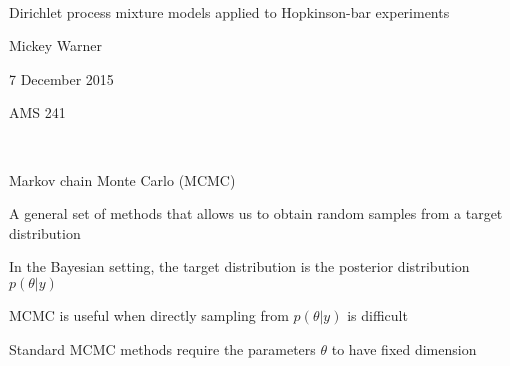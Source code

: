 \documentclass[mathserif, 12pt, t]{beamer}
\newcommand{\m}[1]{#1}
\renewcommand{\frametitle}[1]{\vspace{0.14cm}\hspace{-0.70cm}\textcolor{col2}{%
    \Large{#1}}\vspace{0.15cm}\newline}
\begin{document}
\ \\ [-0.5in]
\vfill
\bigskip
\bigskip
\bigskip
\bigskip
\bigskip

\begin{Large}
Dirichlet process mixture models applied to Hopkinson-bar experiments
\end{Large}
\vfill

Mickey Warner
\vfill

7 December 2015
\smallskip

AMS 241

\bigskip
\bigskip
\vfill
\ \\ [-0.5in]



\begin{frame}
\frametitle{Markov chain Monte Carlo (MCMC)}

A general set of methods that allows us to obtain random samples from a target distribution
\bigskip

In the Bayesian setting, the target distribution is the posterior distribution $p(\m{\theta}|\m{y})$
\bigskip

MCMC is useful when directly sampling from $p(\m{\theta}|\m{y})$ is difficult
\bigskip

Standard MCMC methods require the parameters $\m{\theta}$ to have fixed dimension


\end{frame}
\end{document}
